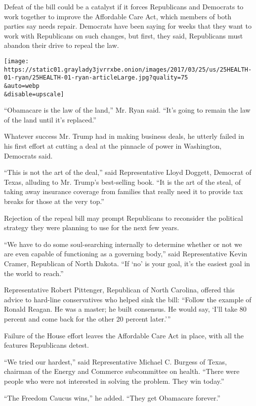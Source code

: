 Defeat of the bill could be a catalyst if it forces Republicans and
Democrats to work together to improve the Affordable Care Act, which
members of both parties say needs repair. Democrats have been saying for
weeks that they want to work with Republicans on such changes, but
first, they said, Republicans must abandon their drive to repeal the
law.

\texttt{[image: https://static01.graylady3jvrrxbe.onion/images/2017/03/25/us/25HEALTH-01-ryan/25HEALTH-01-ryan-articleLarge.jpg?quality=75\\\&auto=webp\\\&disable=upscale]}

``Obamacare is the law of the land,'' Mr. Ryan said. ``It's going to
remain the law of the land until it's replaced.''

Whatever success Mr. Trump had in making business deals, he utterly
failed in his first effort at cutting a deal at the pinnacle of power in
Washington, Democrats said.

``This is not the art of the deal,'' said Representative Lloyd Doggett,
Democrat of Texas, alluding to Mr. Trump's best-selling book. ``It is
the art of the steal, of taking away insurance coverage from families
that really need it to provide tax breaks for those at the very top.''

Rejection of the repeal bill may prompt Republicans to reconsider the
political strategy they were planning to use for the next few years.

``We have to do some soul-searching internally to determine whether or
not we are even capable of functioning as a governing body,'' said
Representative Kevin Cramer, Republican of North Dakota. ``If `no' is
your goal, it's the easiest goal in the world to reach.''

Representative Robert Pittenger, Republican of North Carolina, offered
this advice to hard-line conservatives who helped sink the bill:
``Follow the example of Ronald Reagan. He was a master; he built
consensus. He would say, `I'll take 80 percent and come back for the
other 20 percent later.'''

Failure of the House effort leaves the Affordable Care Act in place,
with all the features Republicans detest.

``We tried our hardest,'' said Representative Michael C. Burgess of
Texas, chairman of the Energy and Commerce subcommittee on health.
``There were people who were not interested in solving the problem. They
win today.''

``The Freedom Caucus wins,'' he added. ``They get Obamacare forever.''

